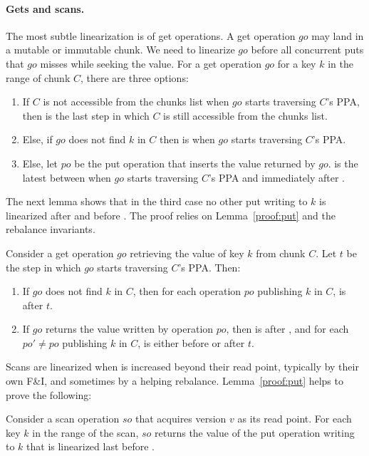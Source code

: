 \paragraph{Gets and scans.}

The most subtle linearization is of get operations.
A get operation $go$ may land in a mutable or immutable chunk. 
We need to linearize $go$ before all concurrent puts that $go$ misses while seeking the value.
For a get operation $go$ for a key $k$ in the range of chunk $C$, there are three options:
\begin{enumerate}
\setlength{\itemsep}{0pt}
\setlength{\parskip}{0pt}
\item If $C$ is not accessible from the chunks list when $go$ starts traversing $C$'s PPA, then  is the last step in which $C$ is still accessible from the chunks list.
\item Else, if $go$ does not find $k$ in $C$ then  is when $go$ starts traversing $C$'s PPA.
\item Else, let $po$ be the put operation that inserts the value returned by $go$.  is the latest between when $go$ starts traversing $C$'s {PPA} and immediately after .
\end{enumerate}

The next lemma shows that in the third case no other put writing to $k$ is linearized after  and before .
The proof relies on %
Lemma~\ref{proof:put} and the rebalance invariants.%

\begin{lemma}
\label{proof:get}
Consider a get operation $go$ retrieving the value of key $k$ from chunk $C$. Let $t$ be the step in which $go$ starts traversing $C$'s {PPA}. Then:
\begin{enumerate}
\setlength{\itemsep}{0pt}
\setlength{\parskip}{0pt}
\item \label{proof:get:lp1} If $go$ does not find $k$ in $C$, then for each operation $po$ publishing $k$ in $C$,  is after $t$.
\item \label{proof:get:lp2} If $go$ returns the value written by operation $po$, then  is after , and for each  $po' \neq po$ publishing $k$ in $C$,  is either before  or after $t$.
\end{enumerate}
\end{lemma}

Scans are linearized when  is increased beyond their read point, typically by their own F\&I, and sometimes by a helping rebalance. 
Lemma~\ref{proof:put} helps to prove the following:
\begin{lemma}
\label{proof:scan}
Consider a scan operation $so$ that acquires version $v$ as its read point. For each key $k$ in the range of the scan, $so$ returns the value of the put operation writing to $k$ that is linearized last before .
\end{lemma}

